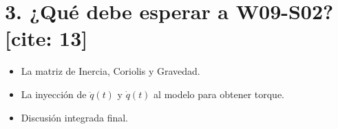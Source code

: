 \documentclass[11pt, a4paper]{article}
\begin{document}
\section*{3. ¿Qué debe esperar a W09-S02?[cite: 13]}
\begin{itemize}
    \item La matriz de Inercia, Coriolis y Gravedad.
    \item La inyección de $\ddot{q}(t)$ y $\dot{q}(t)$ al modelo para obtener torque.
    \item Discusión integrada final.
\end{itemize}
\end{document}

